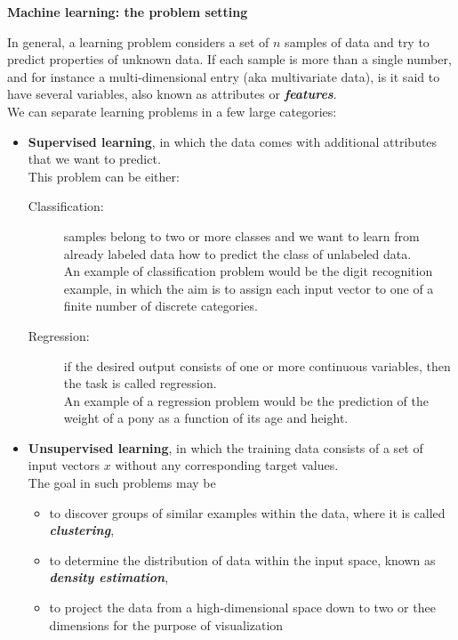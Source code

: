 \documentclass[SKL-MASTER.tex]{subfiles}
\begin{document}
\LARGE
\noindent \textbf{Machine learning: the problem setting}

\noindent In general, a learning problem considers a set of $n$ samples of data and try to predict properties of unknown data. If
each sample is more than a single number, and for instance a multi-dimensional entry (aka multivariate data), is it said
to have several variables, also known as attributes or \textbf{\textit{features}}.\\
\bigskip
We can separate learning problems in a few large categories:

\begin{itemize}
\item \textbf{Supervised learning}, in which the data comes with additional attributes that we want to predict.\\ 
\bigskip
This problem can be either:
\begin{description}
\item[Classification:] samples belong to two or more classes and we want to learn from already labeled data how
to predict the class of unlabeled data. \\ An example of classification problem would be the digit recognition
example, in which the aim is to assign each input vector to one of a finite number of discrete categories.
\item[Regression:] if the desired output consists of one or more continuous variables, then the task is called
regression. \\ An example of a regression problem would be the prediction of the weight of a pony as a
function of its age and height.
\end{description}

\newpage
\item  \textbf{Unsupervised learning}, in which the training data consists of a set of input vectors $x$ without any corresponding
target values. \\ \bigskip The goal in such problems may be
\begin{itemize}
\item to discover groups of similar examples within the data, where
it is called \textbf{\textit{clustering}}, \item to determine the distribution of data within the input space, known as \textbf{\textit{density estimation}},
\item to project the data from a high-dimensional space down to two or thee dimensions for the purpose of
visualization 
\end{itemize}
\end{itemize}

\end{document}
